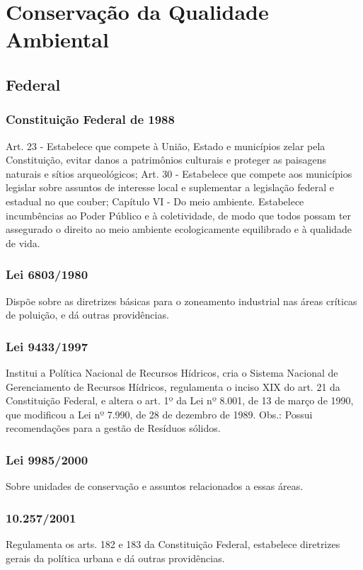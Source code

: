 \section{Conservação da Qualidade Ambiental}

\begin{subapend}
	\subsection{Federal}
	\begin{subsubapend}
		\subsubsection{Constituição Federal de 1988}
		Art. 23 - Estabelece que compete à União, Estado e municípios zelar pela Constituição, evitar danos a patrimônios culturais e proteger as paisagens naturais e sítios arqueológicos;
		Art. 30 - Estabelece que compete aos municípios legislar sobre assuntos de interesse local e suplementar a legislação federal e estadual no que couber;
		Capítulo VI - Do meio ambiente. Estabelece incumbências ao Poder Público e à coletividade, de modo que todos possam ter assegurado o direito ao meio ambiente ecologicamente equilibrado e à qualidade de vida.
		\subsubsection{Lei 6803/1980}
		Dispõe sobre as diretrizes básicas para o zoneamento industrial nas áreas críticas de poluição, e dá outras providências.
		\subsubsection{Lei 9433/1997}
		Institui a Política Nacional de Recursos Hídricos, cria o Sistema Nacional de Gerenciamento de Recursos Hídricos, regulamenta o inciso XIX do art. 21 da Constituição Federal, e altera o art. 1º da Lei nº 8.001, de 13 de março de 1990, que modificou a Lei nº 7.990, de 28 de dezembro de 1989. Obs.: Possui recomendações para a gestão de Resíduos sólidos.
		\subsubsection{Lei 9985/2000}
		Sobre unidades de conservação e assuntos relacionados a essas áreas.
		\subsubsection{10.257/2001}
		Regulamenta os arts. 182 e 183 da Constituição Federal, estabelece diretrizes gerais da política urbana e dá outras providências.

\end{subsubapend}
\end{subapend}
